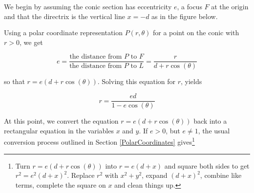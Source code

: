 \documentclass{ximera}
\begin{document}
 

We begin by assuming the conic section has eccentricity $e$, a focus $F$ at the origin and that the  directrix is the vertical line $x = -d$ as in the figure below.  

\begin{image}
\end{image}


Using a polar coordinate representation $P(r,\theta)$ for a point on the conic with $r > 0$, we get

\[ e =  \frac{\text{the distance from $P$ to $F$}}{\text{the distance from $P$ to $L$}} = \frac{r}{d+r\cos(\theta)} \]

so that $r = e(d+r\cos(\theta))$.  Solving this equation for $r$, yields 


\[ r = \frac{ed}{1-e\cos(\theta)}\]

At this point, we convert the equation $r = e(d+r\cos(\theta))$ back into a rectangular equation in the variables $x$ and $y$.  If $e > 0$, but $e\neq 1$, the usual conversion process outlined in Section \ref{PolarCoordinates} gives\footnote{Turn $r = e(d+r\cos(\theta))$ into $r = e(d + x)$ and square both sides to get $r^{2} = e^{2}(d + x)^{2}$.  Replace $r^{2}$ with $x^{2} + y^{2}$, expand $(d + x)^{2}$, combine like terms, complete the square on $x$ and clean things up.}
\end{document}
